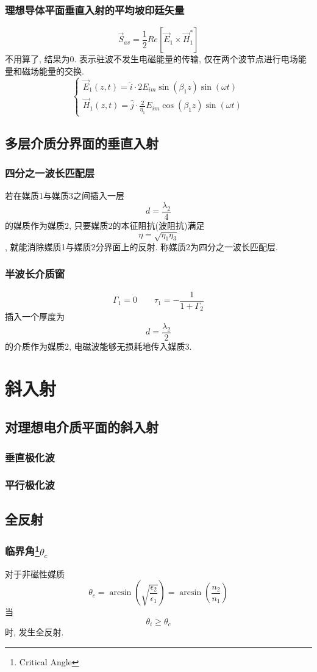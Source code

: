 \documentclass[a4paper]{report}
\begin{document}
\subsubsection{理想导体平面垂直入射的平均坡印廷矢量}
$$\vec{S}_{av}=\frac{1}{2}Re[\vec{E}_1\times \vec{H}_1^\ast  ]$$
不用算了, 结果为0. 表示驻波不发生电磁能量的传输, 仅在两个波节点进行电场能量和磁场能量的交换.
$$\begin{cases}
    \vec{E}_1(z,t)=\hat{i}\cdot 2E_{im}\sin(\beta_1 z)\sin(\omega t)\\
    \vec{H}_1(z,t)=\hat{j}\cdot \frac{2}{\eta_1}E_{im}\cos(\beta_1 z)\sin(\omega t) 
\end{cases}$$ 
\subsection{多层介质分界面的垂直入射}
\subsubsection{四分之一波长匹配层}
若在媒质1与媒质3之间插入一层$$d=\frac{\lambda_2}{4}$$的媒质作为媒质2, 只要媒质2的本征阻抗(波阻抗)满足$$\eta=\sqrt{\eta_1\eta_3}$$, 就能消除媒质1与媒质2分界面上的反射. 称媒质2为四分之一波长匹配层. 
\subsubsection{半波长介质窗}
$$\Gamma_1=0\qquad\tau_1=-\frac{1}{1+\Gamma_2}$$
插入一个厚度为$$d=\frac{\lambda_2}{2}$$的介质作为媒质2, 电磁波能够无损耗地传入媒质3. 

\section{斜入射}
\subsection{对理想电介质平面的斜入射}
\subsubsection{垂直极化波}
\subsubsection{平行极化波}
\subsection{全反射}
\subsubsection{临界角\protect\footnote{Critical Angle}$\theta_c$}
对于非磁性媒质
$$\theta_c=\arcsin(\sqrt{\frac{\epsilon_2}{\epsilon_1}})=\arcsin(\frac{n_2}{n_1})$$
当$$\theta_i\geq\theta_c$$时, 发生全反射. 
\end{document}
